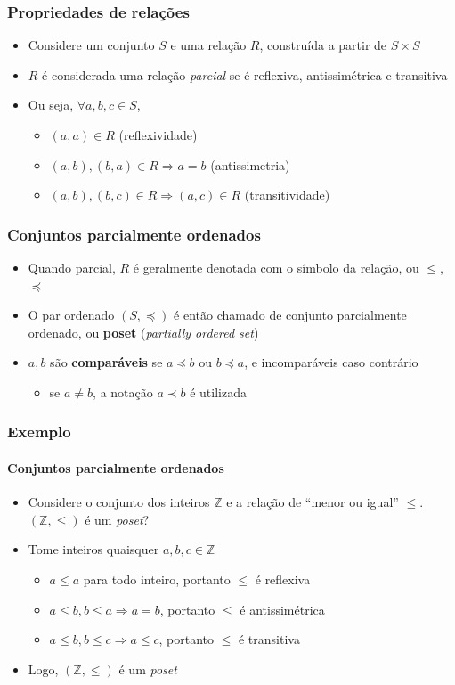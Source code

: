 \documentclass[12pt]{beamer}
\begin{document}
\begin{frame}
  \frametitle{Propriedades de relações}
  \begin{itemize}
    \item Considere um conjunto $S$ e uma relação $R$, construída a partir de
        $S \times S$
    \item $R$ é considerada uma relação \emph{parcial} se é reflexiva,
        antissimétrica e transitiva
    \item Ou seja, $\forall a, b, c \in S$,
    \begin{itemize}[itemsep=0pt]
      \item $(a, a) \in R$ (reflexividade)
      \item $(a, b), (b, a) \in R \Rightarrow a = b$ (antissimetria)
      \item $(a, b), (b, c) \in R \Rightarrow (a, c) \in R$ (transitividade)
    \end{itemize}
  \end{itemize}
\end{frame}

\begin{frame}
  \frametitle{Conjuntos parcialmente ordenados}
  \begin{itemize}
    \item Quando parcial, $R$ é geralmente denotada com o símbolo da relação,
        ou $\leq$, $\preccurlyeq$
    \item O par ordenado $(S, \preccurlyeq)$ é então chamado de conjunto
        parcialmente ordenado, ou \textbf{poset} (\emph{partially ordered set})
    \item $a, b$ são \textbf{comparáveis} se $a \preccurlyeq b$ ou $b
        \preccurlyeq a$, e incomparáveis caso contrário
    \begin{itemize}
      \item se $a \neq b$, a notação $a \prec b$ é utilizada
    \end{itemize}
  \end{itemize}
\end{frame}

\begin{frame}
  \frametitle{Exemplo}
  \framesubtitle{Conjuntos parcialmente ordenados}
  \begin{itemize}
    \item Considere o conjunto dos inteiros $\mathbb{Z}$ e a relação de ``menor
        ou igual'' $\leq$. $(\mathbb{Z}, \leq)$ é um \emph{poset}?
    \item Tome inteiros quaisquer $a, b, c \in \mathbb{Z}$
    \begin{itemize}[itemsep=0pt]
      \item $a \leq a$ para todo inteiro, portanto $\leq$ é reflexiva
      \item $a \leq b, b \leq a \Rightarrow a = b$, portanto $\leq$ é
          antissimétrica
      \item $a \leq b, b \leq c \Rightarrow a \leq c$, portanto $\leq$ é
          transitiva
    \end{itemize}
    \item Logo, $(\mathbb{Z}, \leq)$ é um \emph{poset}
  \end{itemize}
\end{frame}
\end{document}
